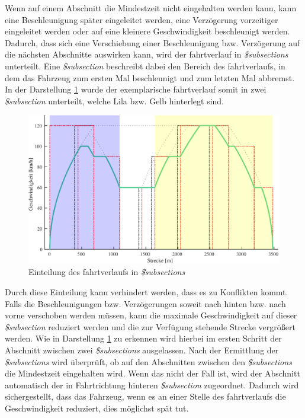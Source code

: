 Wenn auf einem Abschnitt die Mindestzeit nicht eingehalten werden kann, kann eine Beschleunigung später eingeleitet werden, eine Verzögerung vorzeitiger eingeleitet werden oder auf eine kleinere Geschwindigkeit beschleunigt werden. Dadurch, dass sich eine Verschiebung einer Beschleunigung bzw. Verzögerung auf die nächsten Abschnitte auswirken kann, wird der \Gls{fahrtverlauf} in \textit{\$subsections} unterteilt. Eine \textit{\$subsection} beschreibt dabei den Bereich des \Gls{fahrtverlauf}s, in dem das Fahrzeug zum ersten Mal beschleunigt und zum letzten Mal abbremst. In der Darstellung \ref{fig:it7} wurde der exemplarische \Gls{fahrtverlauf} somit in zwei \textit{\$subsection} unterteilt, welche Lila bzw. Gelb hinterlegt sind.
\begin{figure}
\includegraphics[width=\linewidth]{../images/matlab/it7.pdf}
\caption{Einteilung des \Gls{fahrtverlauf}s in \textit{\$subsections}}
\label{fig:it7}
\end{figure}
Durch diese Einteilung kann verhindert werden, dass es zu Konflikten kommt. Falls die Beschleunigungen bzw. Verzögerungen soweit nach hinten bzw. nach vorne verschoben werden müssen, kann die maximale Geschwindigkeit auf dieser \textit{\$subsection} reduziert werden und die zur Verfügung stehende Strecke vergrößert werden. Wie in Darstellung \ref{fig:it7} zu erkennen wird hierbei im ersten Schritt der Abschnitt zwischen zwei \textit{\$subsections} ausgelassen. Nach der Ermittlung der \textit{\$subsections} wird überprüft, ob auf den Abschnitten zwischen den \textit{\$subsections} die Mindestzeit eingehalten wird. Wenn das nicht der Fall ist, wird der Abschnitt automatisch der in Fahrtrichtung hinteren \textit{\$subsection} zugeordnet. Dadurch wird sichergestellt, dass das Fahrzeug, wenn es an einer Stelle des \Gls{fahrtverlauf}s die Geschwindigkeit reduziert, dies möglichst spät tut.

